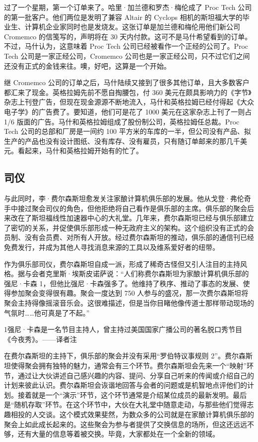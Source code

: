 \documentclass[12pt,UTF8]{ctexbook}
\begin{document}
过了一个星期，第一个订单来了。哈里·加兰德和罗杰·梅伦成了 Proc Tech 公司的第一批客户。他们两位是发明了兼容 Altair 的 Cyclops 相机的斯坦福大学的毕业生、计算机企业家同时也是发烧友。这张订单是加兰德和梅伦用他们新公司 Cromemco 的信笺写的，声明将在 30 天内付款。这可不是马什希望看到的订单。不过，马什认为，这意味着 Proc Tech 公司已经被看作一个正经的公司了。Proc Tech 公司是一家正经公司，Cromemco 公司也是一家正经公司，只不过它们之间还没有正式的金钱来往。噢，好吧，这算是一个开始。

继 Cromemco 公司的订单之后，马什陆续又接到了很多其他订单，且大多数客户都汇来了现金。英格拉姆先前不愿自掏腰包，付 360 美元在颇具影响力的《字节》杂志上刊登广告，但现在现金源源不断地流入，马什和英格拉姆已经付得起《大众电子学》的广告费了。要知道，他们可是花了 1000 美元在这家杂志上刊了一则占 1/6 版面的广告。马什和英格拉姆组成了股份制公司，英格拉姆任总裁。Proc Tech 公司的总部和厂房是一间约 100 平方米的车库的一半，但公司没有产品、拟生产的产品也没有设计图纸、没有库存、没有雇员，只有随订单邮来的那几千美元。看起来，马什和英格拉姆开始有的忙了。





\subsection{司仪}


与此同时，李·费尔森斯坦愈发关注家酿计算机俱乐部的发展。他从戈登·弗伦奇手中接过聚会司仪的角色，但他拒绝将自己看作是俱乐部的主席。俱乐部的聚会后来改在了斯坦福线性加速器中心的大礼堂。几年来，费尔森斯坦已经与俱乐部建立了密切的关系，并促使俱乐部形成一种无政府主义的架构。这个组织没有正式的会员制、没有会员费、对所有人开放。经过费尔森斯坦的推动，俱乐部的通信刊已经免费发行，并成为其他人寻找消息来源的工具以及维系爱好者的纽带。

作为俱乐部司仪，费尔森斯坦自成一派，形成了稀奇古怪但又引人注目的主持风格。据与会者克里斯·埃斯皮诺萨说：“人们称费尔森斯坦为家酿计算机俱乐部的强尼·卡森 1，但他比强尼·卡森强多了。他维持了秩序、推动了事态的发展、使得参加聚会变得很有趣。聚会一度达到 750 人参与的盛况，那一次费尔森斯坦将聚会主持得像摇滚音乐会。这很难描述，但是当你目睹他像传道士那样带动现场的气氛时……他可真是了不起。”

1强尼·卡森是一名节目主持人，曾主持过美国国家广播公司的著名脱口秀节目《今夜秀》。——译者注

在费尔森斯坦的主持下，俱乐部的聚会并没有采用“罗伯特议事规则 2”。费尔森斯坦使得聚会拥有独特的魅力，通常会有三个环节。费尔森斯坦会先来一个“映射”环节，通过让大伙讲述自己感兴趣的内容、提问、分享自己听来的传闻或介绍自己的计划来彼此认识。费尔森斯坦会诙谐地回答与会者的问题或是机智地点评他们的计划。接着就是一个“演示”环节，这个环节通常是介绍某位成员的最新发明。最后是“随机存取”环节。在这个环节中，大伙在大礼堂中随意走动，与那些他们觉得志趣相投的人交谈。这个模式效果斐然，为数众多的公司就是在家酿计算机俱乐部的聚会上如此成长起来的。这些聚会为参与者提供了交换信息的场所，但这还远远不够，还有大量的信息等着被交换。毕竟，大家都处在一个全新的领域。
\end{document}
